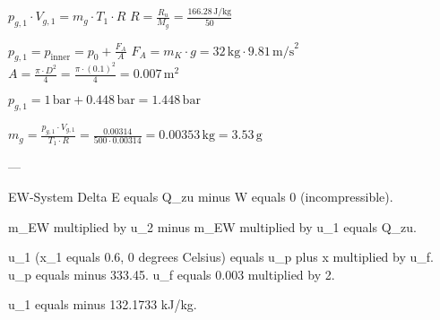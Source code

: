 \( p_{g,1} \cdot V_{g,1} = m_g \cdot T_1 \cdot R \)  
\( R = \frac{R_u}{M_g} = \frac{166.28 \, \text{J/kg}}{50} \)  

\( p_{g,1} = p_{\text{inner}} = p_0 + \frac{F_A}{A} \)  
\( F_A = m_K \cdot g = 32 \, \text{kg} \cdot 9.81 \, \text{m/s}^2 \)  
\( A = \frac{\pi \cdot D^2}{4} = \frac{\pi \cdot (0.1)^2}{4} = 0.007 \, \text{m}^2 \)  

\( p_{g,1} = 1 \, \text{bar} + 0.448 \, \text{bar} = 1.448 \, \text{bar} \)  

\( m_g = \frac{p_{g,1} \cdot V_{g,1}}{T_1 \cdot R} = \frac{0.00314}{500 \cdot 0.00314} = 0.00353 \, \text{kg} = 3.53 \, \text{g} \)  

---

EW-System  
Delta E equals Q_zu minus W equals 0 (incompressible).  

m_EW multiplied by u_2 minus m_EW multiplied by u_1 equals Q_zu.  

u_1 (x_1 equals 0.6, 0 degrees Celsius) equals u_p plus x multiplied by u_f.  
u_p equals minus 333.45.  
u_f equals 0.003 multiplied by 2.  

u_1 equals minus 132.1733 kJ/kg.